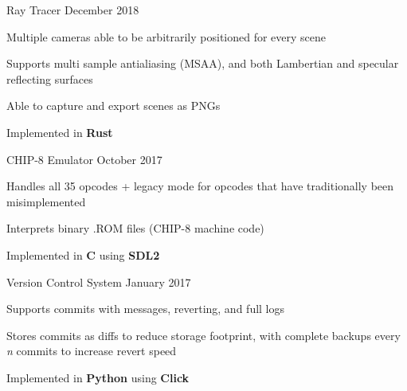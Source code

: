 \begin{cventries}
    \cventry
    {Ray Tracer} %
    {} %
    {}{December 2018}{
        \begin{cvitems} %
            \item {Multiple cameras able to be arbitrarily positioned for every scene}
            \item {Supports multi sample antialiasing (MSAA), and both Lambertian and specular reflecting surfaces}
            \item {Able to capture and export scenes as PNGs}
            \item {Implemented in \textbf{Rust}}
        \end{cvitems}
    }

    \cventry
    {CHIP-8 Emulator} %
    {} %
    {}{October 2017}{
        \begin{cvitems} %
            \item {Handles all 35 opcodes + legacy mode for opcodes that have traditionally been misimplemented}
            \item {Interprets binary .ROM files (CHIP-8 machine code)}
            \item {Implemented in \textbf{C} using \textbf{SDL2}}
        \end{cvitems}
    }

    \cventry
    {Version Control System} %
    {} %
    {}{January 2017}{
        \begin{cvitems} %
            \item {Supports commits with messages, reverting, and full logs}
            \item {Stores commits as diffs to reduce storage footprint, with complete backups every \textit{n} commits to increase revert speed}
            \item {Implemented in \textbf{Python} using \textbf{Click}}
        \end{cvitems}
    }



\end{cventries}
